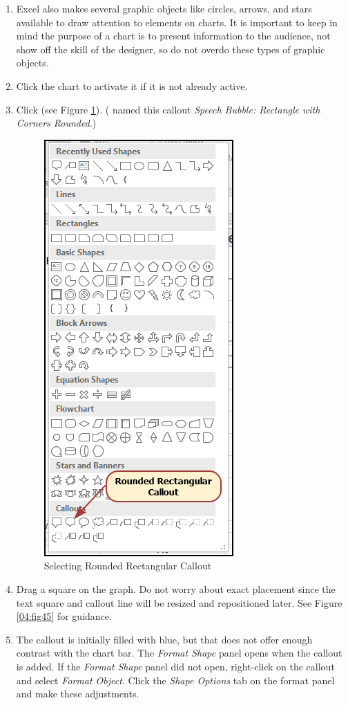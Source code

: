 \begin{enumerate}
	\item Excel also makes several graphic objects like circles, arrows, and stars available to draw attention to elements on charts. It is important to keep in mind the purpose of a chart is to present information to the audience, not show off the skill of the designer, so do not overdo these types of graphic objects.
	\item Click the chart to activate it if it is not already active.
	\item Click  (see Figure \ref{04:fig44}). ( named this callout \textit{Speech Bubble: Rectangle with Corners Rounded}.)

	\begin{figure}[H]
		\centering
		\includegraphics[width=\maxwidth{.45\linewidth}]{gfx/ch04_fig44}
		\caption{Selecting Rounded Rectangular Callout}
		\label{04:fig44}
	\end{figure}

	\item Drag a square on the graph. Do not worry about exact placement since the text square and callout line will be resized and repositioned later. See Figure \ref{04:fig45} for guidance.
	\item The callout is initially filled with blue, but that does not offer enough contrast with the chart bar. The \textit{Format Shape} panel opens when the callout is added. If the \textit{Format Shape} panel did not open, right-click on the callout and select \textit{Format Object}. Click the \textit{Shape Options} tab on the format panel and make these adjustments.
	

\end{enumerate}
